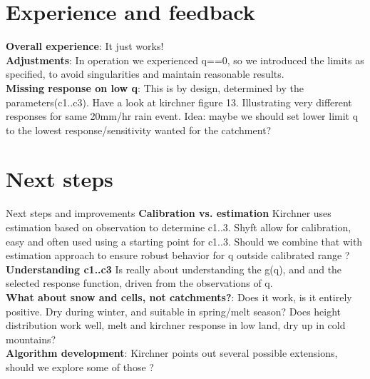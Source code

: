 \documentclass{beamer}
\begin{document}
\section{Experience and feedback}
\begin{frame}
	\textbf{Overall experience}: It just works!\\
	\textbf{Adjustments}: In operation we experienced q==0, so we introduced the limits as specified, to avoid singularities and maintain reasonable results.\\
	\textbf{Missing response on low q}: This is by design, determined by the parameters(c1..c3). Have a look at kirchner figure 13. Illustrating very different responses for same 20mm/hr rain event. Idea: maybe we should set lower limit q to the lowest response/sensitivity wanted for the catchment?\\
\end{frame}
\section{Next steps}
\begin{frame}{Next steps and improvements}
	\textbf{Calibration vs. estimation} Kirchner uses estimation based on observation to determine c1..3. Shyft allow for calibration, easy and often used using a starting point for c1..3. Should we combine that with estimation approach to ensure robust behavior for q outside calibrated range ?\\
	
	\textbf{Understanding c1..c3} Is really about understanding the g(q), and and the selected response function, driven from the observations of q.\\
	
	\textbf{What about snow and cells, not catchments?}: Does it work, is it entirely positive. Dry during winter, and suitable in spring/melt season? Does height distribution work well, melt and kirchner response in low land, dry up in cold mountains? \\
	
	\textbf{Algorithm development}: Kirchner points out several possible extensions, should we explore some of those ?
	
\end{frame}
\end{document}
